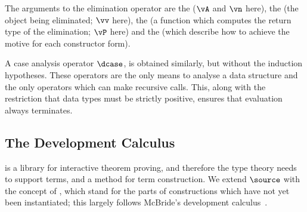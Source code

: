 
The arguments to the elimination operator are the  ($\vA$
and $\vn$ here), the  (the object being eliminated;
$\vv$ here), the  (a function which computes the return
type of the elimination; $\vP$ here) and the 
(which describe how to achieve the motive for each constructor form).

A case analysis operator $\dcase$, is obtained similarly, but without
the induction hypotheses. These operators are the only means to
analyse a data structure and the only operators which can make
recursive calls. This, along with the restriction that data types must
be strictly positive, ensures that evaluation always terminates.

\subsection{The Development Calculus}

\Ivor{} is a library for interactive theorem proving, and therefore
the type theory needs to support  terms, and a
method for term construction. We extend $\source$ with the concept of
, which stand for the parts of constructions which have
not yet been instantiated; this largely follows McBride's \Oleg{}
development calculus~\cite{mcbride-thesis}.

